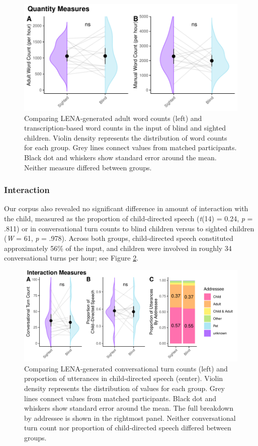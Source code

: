 \documentclass[
  man,floatsintext]{apa6}
\begin{document}
\begin{figure}
\includegraphics{input_quality_manuscript_files/figure-latex/quantity-plots-1} \caption{Comparing LENA-generated adult word counts (left) and transcription-based word counts in the input of blind and sighted children. Violin density represents the distribution of word counts for each group. Grey lines connect values from matched participants. Black dot and whiskers show standard error around the mean. Neither measure differed between groups.}\label{fig:quantity-plots}
\end{figure}

\hypertarget{interaction-1}{%
\subsubsection{Interaction}\label{interaction-1}}

Our corpus also revealed no significant difference in amount of interaction with the child, measured as the proportion of child-directed speech (\emph{t}(14) = 0.24, \emph{p} = .811) or in conversational turn counts to blind children versus to sighted children (\emph{W} = 61, \emph{p} = .978). Across both groups, child-directed speech constituted approximately 56\% of the input, and children were involved in roughly 34 conversational turns per hour; see Figure \ref{fig:interaction-plots}.

\begin{figure}
\includegraphics{input_quality_manuscript_files/figure-latex/interaction-plots-1} \caption{Comparing LENA-generated conversational turn counts (left) and proportion of utterances in child-directed speech (center).  Violin density represents the distribution of values for each group. Grey lines connect values from matched participants. Black dot and whiskers show standard error around the mean. The full breakdown by addressee is shown in the rightmost panel. Neither conversational turn count nor proportion of child-directed speech differed between groups.}\label{fig:interaction-plots}
\end{figure}
\end{document}
